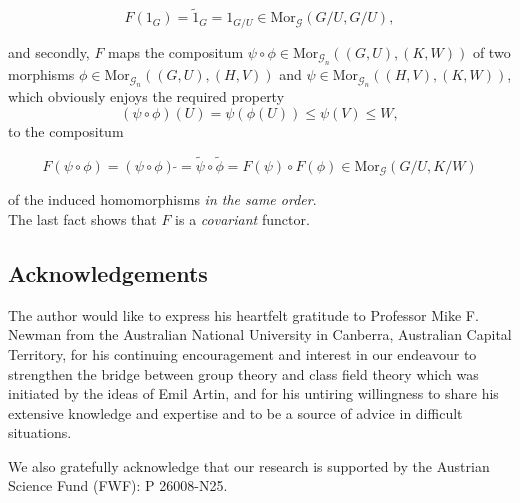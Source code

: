 \documentclass{amsart}
\theoremstyle{definition}
\numberwithin{equation}{section}
\begin{document}
\begin{equation}
\label{eqn:FunctorialIdentity}
F(1_G)=\tilde{1}_G=1_{G/U}\in\mathrm{Mor}_{\mathcal{G}}(G/U,G/U),
\end{equation}

\noindent
and secondly, \(F\) maps the compositum \(\psi\circ\phi\in\mathrm{Mor}_{\mathcal{G}_n}((G,U),(K,W))\)
of two morphisms \(\phi\in\mathrm{Mor}_{\mathcal{G}_n}((G,U),(H,V))\)
and \(\psi\in\mathrm{Mor}_{\mathcal{G}_n}((H,V),(K,W))\),
which obviously enjoys the required property
\[(\psi\circ\phi)(U)=\psi(\phi(U))\le\psi(V)\le W,\]
to the compositum

\begin{equation}
\label{eqn:FunctorialCompositum}
F(\psi\circ\phi)=(\psi\circ\phi)\,\tilde{}=\tilde{\psi}\circ\tilde{\phi}=F(\psi)\circ F(\phi)
\in\mathrm{Mor}_{\mathcal{G}}(G/U,K/W)
\end{equation}

\noindent
of the induced homomorphisms \textit{in the same order}.\\
The last fact shows that \(F\) is a \textit{covariant} functor.



\subsection{Acknowledgements}
\label{ss:Acknowledgements}

The author would like to express his heartfelt gratitude
to Professor Mike F. Newman
from the Australian National University in Canberra, Australian Capital Territory,
for his continuing encouragement and interest in our endeavour
to strengthen the bridge between group theory and class field theory
which was initiated by the ideas of Emil Artin,
and for his untiring willingness to share his extensive knowledge and expertise
and to be a source of advice in difficult situations.

We also gratefully acknowledge that our research is supported by
the Austrian Science Fund (FWF): P 26008-N25.
\end{document}
